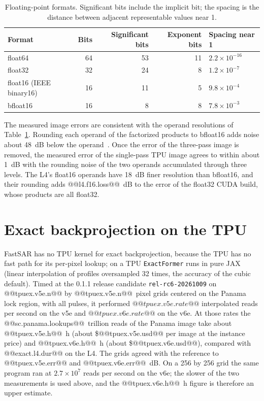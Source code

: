 \documentclass[11pt]{article}
\begin{document}
\begin{table}[H]
\centering
\caption{Floating-point formats. Significant bits include the implicit bit; the spacing is the distance between adjacent representable values near 1.}
\label{tab:formats}
\begin{tabular}{lrrrl}
\toprule
Format & Bits & Significant bits & Exponent bits & Spacing near 1 \\
\midrule
float64 & 64 & 53 & 11 & $2.2 \times 10^{-16}$ \\
float32 & 32 & 24 & 8 & $1.2 \times 10^{-7}$ \\
float16 (IEEE binary16) & 16 & 11 & 5 & $9.8 \times 10^{-4}$ \\
bfloat16 & 16 & 8 & 8 & $7.8 \times 10^{-3}$ \\
\bottomrule
\end{tabular}
\end{table}

The measured image errors are consistent with the operand resolutions of Table~\ref{tab:formats}. Rounding each operand of the factorized products to bfloat16 adds noise about 48~dB below the operand~\cite{higham2002}. Once the error of the three-pass image is removed, the measured error of the single-pass TPU image agrees to within about 1~dB with the rounding noise of the two operands accumulated through three levels. The L4's float16 operands have 18~dB finer resolution than bfloat16, and their rounding adds @@l4.f16.loss@@~dB to the error of the float32 CUDA build, whose products are all float32.

\section{Exact backprojection on the TPU}
\label{app:tpu}

FastSAR has no TPU kernel for exact backprojection, because the TPU has no fast path for its per-pixel lookup; on a TPU \texttt{ExactFormer} runs in pure JAX (linear interpolation of profiles oversampled 32 times, the accuracy of the cubic default). Timed at the 0.1.1 release candidate \texttt{rel-rc6-20261009} on @@tpuex.v5e.n@@ by @@tpuex.v5e.n@@~pixel grids centered on the Panama lock region, with all pulses, it performed $@@tpuex.v5e.rate@@$ interpolated reads per second on the v5e and $@@tpuex.v6e.rate@@$ on the v6e. At those rates the @@sc.panama.lookups@@~trillion reads of the Panama image take about @@tpuex.v5e.h@@~h (about \$@@tpuex.v5e.usd@@ per image at the instance price) and @@tpuex.v6e.h@@~h (about \$@@tpuex.v6e.usd@@), compared with @@exact.l4.dur@@ on the L4. The grids agreed with the reference to @@tpuex.v5e.err@@ and @@tpuex.v6e.err@@~dB. On a 256 by 256 grid the same program ran at $2.7 \times 10^{7}$ reads per second on the v6e; the slower of the two measurements is used above, and the @@tpuex.v6e.h@@~h figure is therefore an upper estimate.
\end{document}
